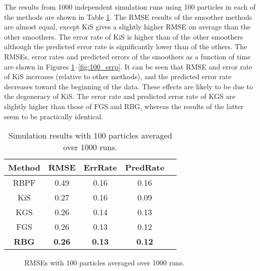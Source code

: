 \documentclass[twocolumn]{autart}    %
\begin{document}
The results from 1000 independent simulation runs using 100 particles
in each of the methods are shown in Table \ref{tbl:res100}. The RMSE
results of the smoother methods are almost equal, except KiS gives a slightly
higher RMSE on average than the other smoothers. The error rate of KiS
is higher than of the other smoothers although the predicted error
rate is significantly lower than of the others. The RMSEs, error rates
and predicted errors of the smoothers as a function of time are shown in
Figures \ref{fig:100_rmse}--\ref{fig:100_errp}. It can be seen that
RMSE and error rate of KiS increases (relative to other methods), and
the predicted error rate decreases toward the beginning of the data.
These effects are likely to be due to the degeneracy of KiS. The error
rate and predicted error rate of KGS are slightly higher than those of FGS
and RBG, whereas the results of the latter seem to be practically
identical.

%
\begin{table}[htb!]
\begin{center}
\begin{tabular}{|c|c|c|c|c|}
\hline
Method & RMSE              & ErrRate       &   PredRate \\
\hline
\hline
RBPF   & 0.49 & 0.16 & 0.16 \\ \hline
KiS    & 0.27 & 0.16 & 0.09 \\ \hline
KGS    & 0.26 & 0.14 & 0.13 \\ \hline
FGS    & 0.26 & 0.13 & 0.12 \\ \hline
{\bf RBG} & {\bf 0.26} & {\bf 0.13} & {\bf 0.12} \\ \hline
\end{tabular}
\end{center}
\caption{Simulation results with 100 particles averaged over 1000 runs. }
\label{tbl:res100}
\end{table}

\begin{figure}[htb!]
\begin{center}
\end{center}
\caption{RMSEs with 100 particles averaged over 1000 runs.}
\label{fig:100_rmse}
\end{figure}
\end{document}
